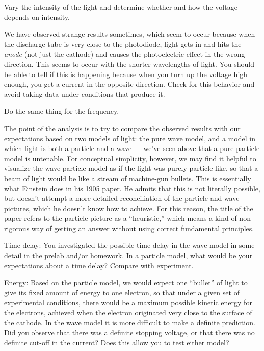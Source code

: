 
Vary the intensity of the light and determine whether and how the voltage depends on intensity.

We have observed strange results sometimes, which seem to occur because when the discharge tube is
very close to the photodiode, light gets in and hits the \emph{anode} (not just the cathode) and
causes the photoelectric effect in the wrong direction. This seems to occur with the shorter wavelengths
of light. You should be able to tell if this is happening because when you turn up the voltage high
enough, you get a current in the opposite direction. Check for this behavior and avoid taking data
under conditions that produce it.


Do the same thing for the frequency.

\analysis

The point of the analysis is to try to compare the observed results with our expectations based
on two models of light:
the pure wave model, and a model in which light is both a particle and a wave --- we've seen
above that a pure particle model is untenable. For conceptual simplicity, however, we may find
it helpful to visualize the wave-particle model as if the light was purely particle-like, so
that a beam of light would be like a stream of machine-gun bullets. This is essentially what
Einstein does in his 1905 paper. He admits that this is not literally possible, but doesn't attempt
a more detailed reconciliation of the particle and wave pictures, which he doesn't know how to
achieve. For this reason, the title of the paper refers to the particle picture as a ``heuristic,''
which means a kind of non-rigorous way of getting an answer without using correct fundamental principles.

Time delay: You investigated the possible time delay in the wave model in some detail in the
prelab and/or homework. In a particle model, what would be your expectations about a time
delay? Compare with experiment.

Energy: Based on the particle model, we would expect one ``bullet'' of light to give its fixed
amount of energy to one electron, so that under a given set of experimental conditions, there
would be a maximum possible kinetic energy for the electrons, achieved when the electron originated
very close to the surface of the cathode. In the wave model it is more difficult to make a definite
prediction. Did you observe that there was a definite stopping voltage, or that there was no definite
cut-off in the current? Does this allow you to test either model?

